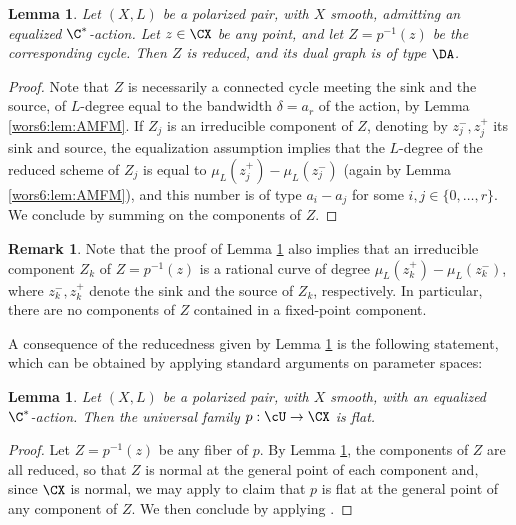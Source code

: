 \documentclass[reqno]{amsproc}
\newtheorem{lemma}[theorem]{Lemma}
\theoremstyle{definition}
\newtheorem{remark}[theorem]{Remark}
\begin{document}
\begin{lemma}\label{wors6:lem:reduced}
Let $(X,L)$ be a polarized pair, with $X$ smooth, admitting an equalized $\C^*$-action. 
Let $z\in \CX$ be any point, and let $Z=p^{-1}(z)$ be the corresponding cycle. 
Then $Z$ is reduced, and its dual graph 
 is of type $\DA$. 
\end{lemma}
\begin{proof}
Note that $Z$ is necessarily a connected cycle meeting the sink and the source, of $L$-degree equal to the bandwidth $\delta=a_r$ of the action, by Lemma \ref{wors6:lem:AMFM}. If $Z_j$ is an irreducible component of $Z$, denoting by $z_j^-,z_j^+$ its sink and source, the equalization assumption implies that the $L$-degree of the reduced scheme of $Z_j$ is equal to $\mu_L(z_j^+)-\mu_L(z_j^-)$ (again by Lemma \ref{wors6:lem:AMFM}), and this number is of type $a_{i}-a_{j}$ for some $i,j\in\{0,\dots,r\}$. We conclude by summing on the components of $Z$.
\end{proof}

\begin{remark}\label{wors6:rem:ratcomp}
Note that the proof of Lemma \ref{wors6:lem:reduced} also implies that an irreducible component $Z_k$ of $Z=p^{-1}(z)$  is a rational curve of degree $\mu_L(z_k^+)-\mu_L(z_k^-)$, where $z_k^-,z_k^+$ denote the sink and the source of $Z_k$, respectively.  In particular, there are no components of $Z$ contained in a fixed-point component.
\end{remark}

A consequence of the reducedness given by Lemma \ref{wors6:lem:reduced} is the following statement, which can be obtained by applying standard arguments on parameter spaces:

\begin{lemma}\label{wors6:lem:flat}
Let $(X,L)$ be a polarized pair, with $X$ smooth,  with an equalized $\C^*$-action.   
Then the universal family $p:\cU\to \CX$  is flat.
\end{lemma}

\begin{proof}
Let $Z=p^{-1}(z)$ be any fiber of $p$. By Lemma \ref{wors6:lem:reduced}, the components of $Z$ are all reduced, so that $Z$ is normal at the general point of each component and, since $\CX$ is normal, we may apply \cite[Theorem~I.6.6]{wors6-kollar} to claim that $p$ is flat at the general point of any component of $Z$. We then conclude by applying \cite[Theorem~I.7.3.1]{wors6-kollar}. 
\end{proof}
\end{document}

